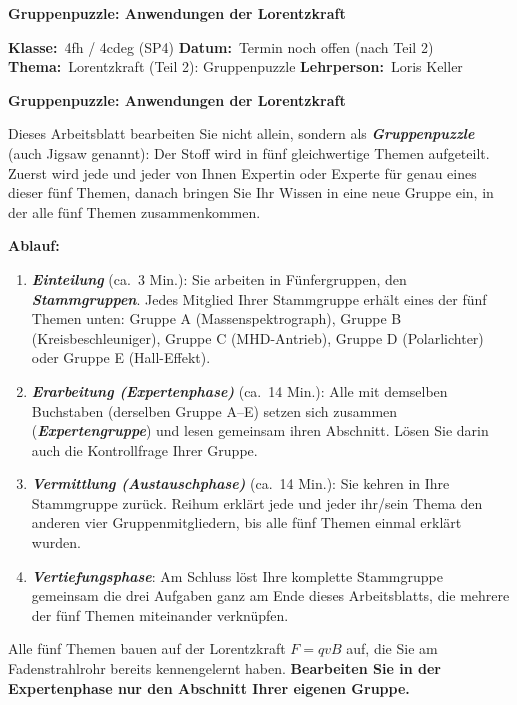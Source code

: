 \documentclass[addpoints,11pt,a4paper]{exam}
\newcommand{\Kopfzeile}[4]{%
  \begin{titlebox}
    {\color{white}\sffamily\bfseries\Large #4}
  \end{titlebox}
  \vspace{0.5em}
  \noindent\textbf{Klasse:}~#1 \hfill \textbf{Datum:}~#2 \hfill \textbf{Thema:}~#3
    \hfill \textbf{Lehrperson:}~Loris Keller
  \vspace{0.8em}
  \lhead{\textcolor{darkgray}{#3}}
  \rhead{\textcolor{darkgray}{#4}}
}
\newcommand{\Klasse}{4fh / 4cdeg (SP4)}
\newcommand{\Datum}{Termin noch offen (nach Teil 2)}
\newcommand{\Thema}{Lorentzkraft (Teil 2): Gruppenpuzzle}
\newcommand{\ArbeitsblattTitel}{Gruppenpuzzle: Anwendungen der Lorentzkraft}
\begin{document}
\Kopfzeile{\Klasse}{\Datum}{\Thema}{\ArbeitsblattTitel}

\textbf{Gruppenpuzzle: Anwendungen der Lorentzkraft}

Dieses Arbeitsblatt bearbeiten Sie nicht allein, sondern als
\textbf{\emph{Gruppenpuzzle}} (auch Jigsaw genannt): Der Stoff wird in fünf
gleichwertige Themen aufgeteilt. Zuerst wird jede und jeder von Ihnen
Expertin oder Experte für genau eines dieser fünf Themen, danach bringen Sie
Ihr Wissen in eine neue Gruppe ein, in der alle fünf Themen zusammenkommen.

\textbf{Ablauf:}
{\sloppy
\begin{enumerate}[leftmargin=1.2cm,itemsep=0.3em]
  \item \textbf{\emph{Einteilung}} (ca.\ 3 Min.): Sie arbeiten in
  Fünfergruppen, den \textbf{\emph{Stammgruppen}}. Jedes Mitglied Ihrer
  Stammgruppe erhält eines der fünf Themen unten: Gruppe A
  (Massenspektrograph), Gruppe B (Kreisbeschleuniger), Gruppe C
  (MHD-Antrieb), Gruppe D (Polarlichter) oder Gruppe E (Hall-Effekt).
  \item \textbf{\emph{Erarbeitung (Expertenphase)}} (ca.\ 14 Min.): Alle mit
  demselben Buchstaben (derselben Gruppe A--E) setzen sich zusammen
  (\textbf{\emph{Expertengruppe}}) und lesen gemeinsam ihren Abschnitt.
  Lösen Sie darin auch die Kontrollfrage Ihrer Gruppe.
  \item \textbf{\emph{Vermittlung (Austauschphase)}} (ca.\ 14 Min.): Sie
  kehren in Ihre Stammgruppe zurück. Reihum erklärt jede und jeder ihr/sein
  Thema den anderen vier Gruppenmitgliedern, bis alle fünf Themen einmal
  erklärt wurden.
  \item \textbf{\emph{Vertiefungsphase}}: Am Schluss löst Ihre komplette
  Stammgruppe gemeinsam die drei Aufgaben ganz am Ende dieses
  Arbeitsblatts, die mehrere der fünf Themen miteinander verknüpfen.
\end{enumerate}
\par}

Alle fünf Themen bauen auf der Lorentzkraft $F=qvB$ auf, die Sie am
Fadenstrahlrohr bereits kennengelernt haben. \textbf{Bearbeiten Sie in der
Expertenphase nur den Abschnitt Ihrer eigenen Gruppe.}
\end{document}
